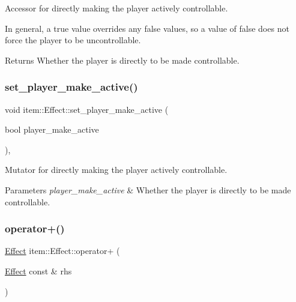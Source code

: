 Accessor for directly making the player actively controllable. 

In general, a {\ttfamily true} value overrides any {\ttfamily false} values, so a value of {\ttfamily false} does not force the player to be uncontrollable. \begin{DoxyReturn}{Returns}
Whether the player is directly to be made controllable. 
\end{DoxyReturn}
\mbox{\label{classitem_1_1_effect_aedb5619a40edeb90776d14691cdb80b1}} 
\subsubsection{\texorpdfstring{set\+\_\+player\+\_\+make\+\_\+active()}{set\_player\_make\_active()}}
{\footnotesize\ttfamily void item\+::\+Effect\+::set\+\_\+player\+\_\+make\+\_\+active (\begin{DoxyParamCaption}\item[{bool}]{player\+\_\+make\+\_\+active }\end{DoxyParamCaption})\hspace{0.3cm}{\ttfamily [inline]}, {\ttfamily [noexcept]}}



Mutator for directly making the player actively controllable. 


\begin{DoxyParams}{Parameters}
{\em player\+\_\+make\+\_\+active} & Whether the player is directly to be made controllable. \\
\hline
\end{DoxyParams}
\mbox{\label{classitem_1_1_effect_a81c4b4c173683d278e1eae7e4ab8048a}} 
\subsubsection{\texorpdfstring{operator+()}{operator+()}}
{\footnotesize\ttfamily \hyperlink{classitem_1_1_effect}{Effect} item\+::\+Effect\+::operator+ (\begin{DoxyParamCaption}\item[{\hyperlink{classitem_1_1_effect}{Effect} const \&}]{rhs }\end{DoxyParamCaption})\hspace{0.3cm}{\ttfamily [inline]}}




